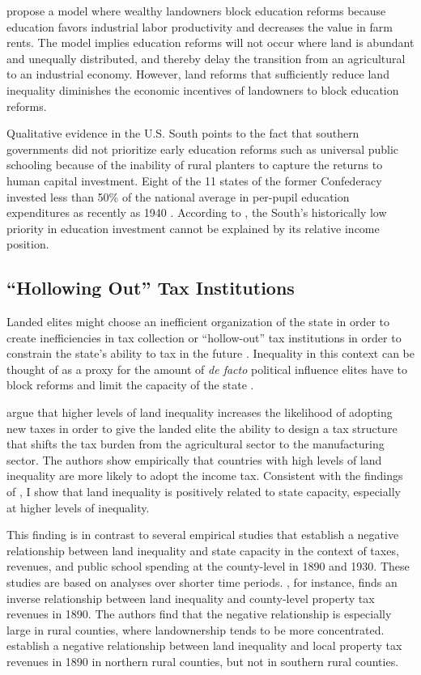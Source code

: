 \citet{galor2009inequality} propose a model where wealthy landowners block education reforms because education favors industrial labor productivity and decreases the value in farm rents. The model implies education reforms will not occur where land is abundant and unequally distributed, and thereby delay the transition from an agricultural to an industrial economy. However, land reforms that sufficiently reduce land inequality diminishes the economic incentives of landowners to block education reforms. 

Qualitative evidence in the U.S. South points to the fact that southern governments did not prioritize early education reforms such as universal public schooling because of the inability of rural planters to capture the returns to human capital investment. Eight of the 11 states of the former Confederacy invested less than 50\% of the national average in per-pupil education expenditures as recently as 1940 \citep{wright1986old}. According to \citet{wright1986old}, the South's historically low priority in education investment cannot be explained by its relative income position. 

\subsection{``Hollowing Out'' Tax Institutions}
	
Landed elites might choose an inefficient organization of the state in order to create inefficiencies in tax collection \citep{acemoglu2011emergence} or ``hollow-out'' tax institutions in order to constrain the state's ability to tax in the future \citep{suryanarayan2017hollowing}. Inequality in this context can be thought of as a proxy for the amount of \emph{de facto} political influence elites have to block reforms and limit the capacity of the state \citep{acemoglu2008persistence}.

\citet{mares2015non} argue that higher levels of land inequality increases the likelihood of adopting new taxes in order to give the landed elite the ability to design a tax structure that shifts the tax burden from the agricultural sector to the manufacturing sector. The authors show empirically that countries with high levels of land inequality are more likely to adopt the income tax.  Consistent with the findings of \citet{mares2015non}, I show that land inequality is positively related to state capacity, especially at higher levels of inequality. 

This finding is in contrast to several empirical studies that establish a negative relationship between land inequality and state capacity in the context of taxes, revenues, and public school spending at the county-level in 1890 and 1930. These studies are based on analyses over shorter time periods. \citet{ramcharan2010inequality}, for instance, finds an inverse relationship between land inequality and county-level property tax revenues in 1890. The authors find that the negative relationship is especially large in rural counties, where landownership tends to be more concentrated. \citet{vollrath2013inequality} establish a negative relationship between land inequality and local property tax revenues in 1890 in northern rural counties, but not in southern rural counties. 

